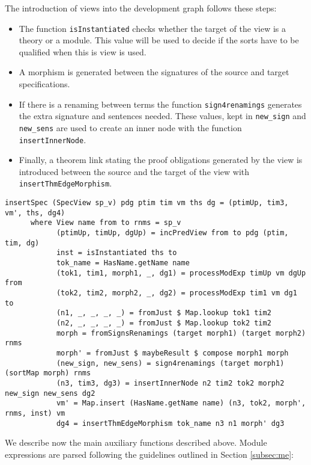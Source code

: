 The introduction of views into the development graph follows these steps:

\begin{itemize}
\item The function \verb"isInstantiated" checks whether the target of the
view is a theory or a module. This value will be used to decide if the
sorts have to be qualified when this is view is used.
\item A morphism is generated between the signatures of the source and
target specifications.
\item If there is a renaming between terms the function \verb"sign4renamings"
generates the extra signature and sentences needed. These values, kept in
\verb"new_sign" and \verb"new_sens" are used to create an inner node with
the function \verb"insertInnerNode".
\item Finally, a theorem link stating the proof obligations generated by
the view is introduced between the source and the target of the view with
\verb"insertThmEdgeMorphism".
\end{itemize}

{\codesize
\begin{verbatim}
insertSpec (SpecView sp_v) pdg ptim tim vm ths dg = (ptimUp, tim3, vm', ths, dg4)
      where View name from to rnms = sp_v
            (ptimUp, timUp, dgUp) = incPredView from to pdg (ptim, tim, dg)
            inst = isInstantiated ths to
            tok_name = HasName.getName name
            (tok1, tim1, morph1, _, dg1) = processModExp timUp vm dgUp from
            (tok2, tim2, morph2, _, dg2) = processModExp tim1 vm dg1 to
            (n1, _, _, _, _) = fromJust $ Map.lookup tok1 tim2
            (n2, _, _, _, _) = fromJust $ Map.lookup tok2 tim2
            morph = fromSignsRenamings (target morph1) (target morph2) rnms
            morph' = fromJust $ maybeResult $ compose morph1 morph
            (new_sign, new_sens) = sign4renamings (target morph1) (sortMap morph) rnms
            (n3, tim3, dg3) = insertInnerNode n2 tim2 tok2 morph2 new_sign new_sens dg2
            vm' = Map.insert (HasName.getName name) (n3, tok2, morph', rnms, inst) vm
            dg4 = insertThmEdgeMorphism tok_name n3 n1 morph' dg3
\end{verbatim}
}

We describe now the main auxiliary functions described above.
Module expressions are parsed following the guidelines outlined in
Section \ref{subsec:me}:

